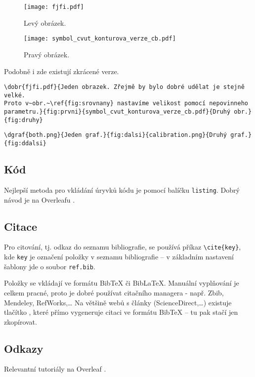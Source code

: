 \documentclass{cygclanek}
\begin{document}
\begin{figure}[H]
    \centering
    \begin{minipage}{0.49\textwidth}
        \centering
        \texttt{[image: fjfi.pdf]}
        \caption{Levý obrázek.}
        \label{fig:levy}
    \end{minipage}\hfill
    \begin{minipage}{0.49\textwidth}
        \centering
        \texttt{[image: symbol\_cvut\_konturova\_verze\_cb.pdf]}
        \caption{Pravý obrázek.}
        \label{fig:pravy}
    \end{minipage}
\end{figure}

Podobně i zde existují zkrácené verze.
\begin{verbatim}
\dobr{fjfi.pdf}{Jeden obrazek. Zřejmě by bylo dobré udělat je stejně velké.
Proto v~obr.~\ref{fig:srovnany} nastavíme velikost pomocí nepovinneho
parametru.}{fig:prvni}{symbol_cvut_konturova_verze_cb.pdf}{Druhý obr.}{fig:druhy}
\end{verbatim}

\begin{verbatim}
\dgraf{both.png}{Jeden graf.}{fig:dalsi}{calibration.png}{Druhý graf.}{fig:ddalsi}
\end{verbatim}


\subsection{Kód}
Nejlepší metoda pro vkládání úryvků kódu je pomocí balíčku \verb|listing|.
Dobrý návod je na Overleafu \cite{overleaf_code_listing}.

\subsection{Citace}
Pro citování, tj. odkaz do seznamu bibliografie, se používá příkaz \verb|\cite{key}|, 
kde \verb|key| je označení položky v seznamu bibliografie -- v základním nastavení šablony 
jde o soubor \verb|ref.bib|. 

Položky se vkládají ve formátu BibTeX či BibLaTeX. Manuální vyplňování je celkem pracné, proto je 
dobré používat citačního managera - např. Zbib, Mendeley, RefWorks,\dots 
Na většině webů s články (ScienceDirect,\dots) existuje tlačítko , které přímo vygeneruje citaci 
ve formátu BibTeX -- tu pak stačí jen zkopírovat.


\subsection{Odkazy}
Relevantní tutoriály na Overleaf \cite{overleaf_referencing,overleaf_hyperlinks}. 
\end{document}
